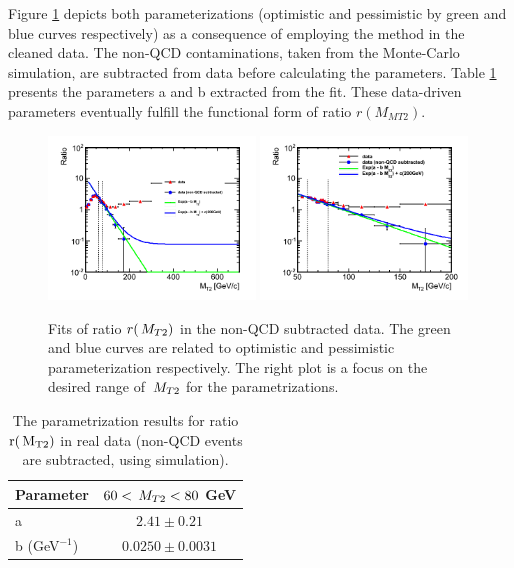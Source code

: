Figure \ref{fig:data_ratio} depicts both parameterizations 
(optimistic and pessimistic by green and blue curves respectively) 
as a consequence of employing the method in the cleaned data.
The non-QCD contaminations, taken from the Monte-Carlo simulation, are subtracted from 
data before calculating the parameters.
Table \ref{tab:data_fit} presents the parameters a and b extracted from the fit. 
These data-driven parameters eventually fulfill the functional form of ratio $r(M_{MT2})$.

\begin{linenomath}
\begin{figure}[h]
\centering
\includegraphics[width=0.49\textwidth,keepaspectratio=true]{QCDFig/data_ratio.png}
\includegraphics[width=0.49\textwidth,keepaspectratio=true]{QCDFig/data_ratio_zoom.png}
\caption{Fits of ratio $r(\,{M_{T2}})$ in the non-QCD subtracted data. 
The green and blue curves are related to optimistic
and pessimistic parameterization respectively. The right plot is a focus on the desired range of $\,{M_{T2}}$ for the parametrizations.} 
\label{fig:data_ratio}
\end{figure}
\end{linenomath}


\begin{linenomath}
\begin{table}[h]
\begin{center}
\small
\begin{tabular}{l|c}\hline\hline
Parameter & $60 < \,{M_{T2}} < 80$ GeV \\ \hline
a	&	$2.41\pm0.21$	\\
b (GeV$^{-1}$)	&	$0.0250\pm0.0031$	\\ \hline\hline
\end{tabular}
\caption[Fit results for data]{The parametrization results for ratio $\rm{r(\ensuremath{\,{M_{T2}}})}$ 
in real data (non-QCD events are subtracted, using simulation).}
\label{tab:data_fit}
\end{center}
\end{table}
\end{linenomath}

